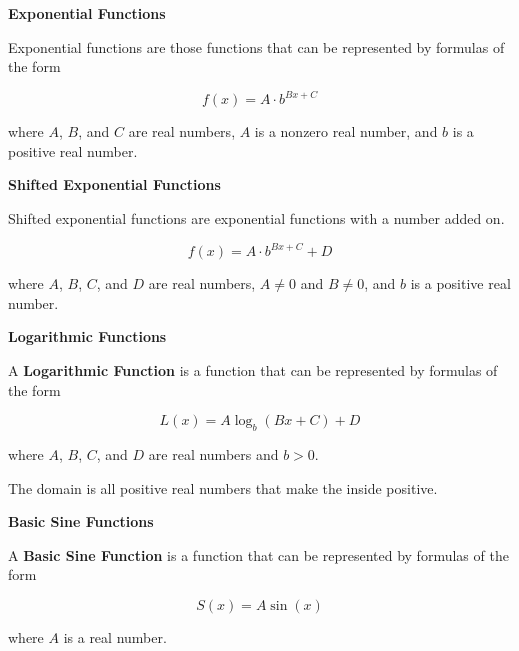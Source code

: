 \documentclass{ximera}
\begin{document}
\begin{definition} \textbf{\textcolor{green!50!black}{Exponential Functions}}

Exponential functions are those functions that can be represented by formulas of the form


\[      f(x) = A \cdot b^{B x + C}   \]

where $A$, $B$, and $C$ are real numbers, $A$ is a nonzero real number, and $b$ is a positive real number.


\end{definition}








\begin{definition} \textbf{\textcolor{green!50!black}{Shifted Exponential Functions}}

Shifted exponential functions are exponential functions with a number added on.


\[      f(x) = A \cdot b^{B x + C} + D   \]

where $A$, $B$, $C$, and $D$ are real numbers, $A \ne 0$ and $B \ne 0$, and $b$ is a positive real number.


\end{definition}











\begin{definition} \textbf{\textcolor{green!50!black}{Logarithmic Functions}}

A \textbf{Logarithmic Function} is a function that can be represented by formulas of the form

\[     L(x) =    A \log_b(B x + C) +D            \]

where $A$, $B$, $C$, and $D$ are real numbers and $b > 0$.

The domain is all positive real numbers that make the inside positive.

\end{definition}















\begin{definition} \textbf{\textcolor{green!50!black}{Basic Sine Functions}}

A \textbf{Basic Sine Function} is a function that can be represented by formulas of the form

\[     S(x) =    A \sin(x)           \]

where $A$ is a real number.


\end{definition}
\end{document}
